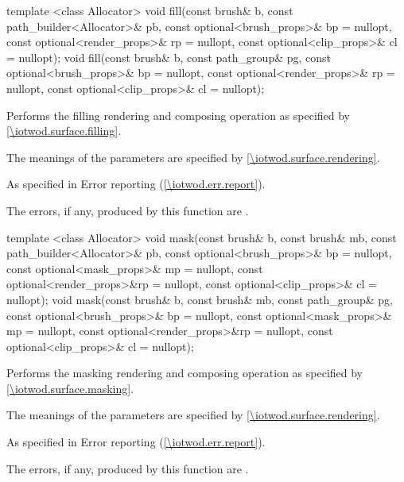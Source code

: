 %
%
\begin{itemdecl}
template <class Allocator>
void fill(const brush& b, const path_builder<Allocator>& pb,
  const optional<brush_props>& bp = nullopt,
  const optional<render_props>& rp = nullopt,
  const optional<clip_props>& cl = nullopt);
void fill(const brush& b, const path_group& pg,
  const optional<brush_props>& bp = nullopt,
  const optional<render_props>& rp = nullopt,
  const optional<clip_props>& cl = nullopt);
\end{itemdecl}
\begin{itemdescr}
\pnum
\effects
Performs the filling rendering and composing operation as specified by \ref{\iotwod.surface.filling}.

\pnum
The meanings of the parameters are specified by \ref{\iotwod.surface.rendering}.

\pnum
\throws
As specified in Error reporting (\ref{\iotwod.err.report}).

\pnum
\errors
The errors, if any, produced by this function are .
\end{itemdescr}

%
%
\begin{itemdecl}
template <class Allocator>
void mask(const brush& b, const brush& mb,
  const path_builder<Allocator>& pb,
  const optional<brush_props>& bp = nullopt,
  const optional<mask_props>& mp = nullopt,
  const optional<render_props>&rp = nullopt,
  const optional<clip_props>& cl = nullopt);
void mask(const brush& b, const brush& mb, const path_group& pg,
  const optional<brush_props>& bp = nullopt,
  const optional<mask_props>& mp = nullopt,
  const optional<render_props>&rp = nullopt,
  const optional<clip_props>& cl = nullopt);
\end{itemdecl}
\begin{itemdescr}
\pnum
\effects
Performs the masking rendering and composing operation as specified by \ref{\iotwod.surface.masking}.

\pnum
The meanings of the parameters are specified by \ref{\iotwod.surface.rendering}.

\pnum
\throws
As specified in Error reporting (\ref{\iotwod.err.report}).

\pnum
\errors

The errors, if any, produced by this function are .
\end{itemdescr}
